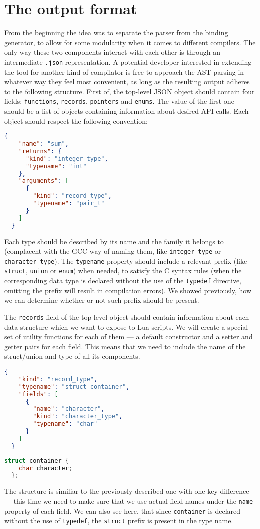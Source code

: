\documentclass[polish, english]{iithesis}
\begin{document}
  \section{The output format}
From the beginning the idea was to separate the parser from the binding generator, to allow for some modularity when it comes to different compilers.
The only way these two components interact with each other is through an intermediate \texttt{.json} representation.
A potential developer interested in extending the tool for another kind of compilator is free to approach the AST parsing in whatever way they feel most convenient, as long as the resulting output adheres to the following structure.
First of, the top-level JSON object should contain four fields: \texttt{functions}, \texttt{records}, \texttt{pointers} and \texttt{enums}. 
The value of the first one should be a list of objects containing information about desired API calls.
Each object should respect the following convention:
\begin{lstlisting}[language=json, caption=Example function \texttt{int sum(pair\_t p)} description]
  {
    "name": "sum",
    "returns": {
      "kind": "integer_type",
      "typename": "int"
    },
    "arguments": [
      {
        "kind": "record_type",
        "typename": "pair_t"
      }
    ]
  }
\end{lstlisting}
Each type should be described by its name and the family it belongs to (complacent with the GCC way of naming them, like \texttt{integer\_type} or \texttt{character\_type}).
The \texttt{typename} property should include a relevant prefix (like \texttt{struct}, \texttt{union} or \texttt{enum}) when needed, to satisfy the C syntax rules (when the corresponding data type is declared without the use of the \texttt{typedef} directive, omitting the prefix will result in compilation errors).
We showed previously, how we can determine whether or not such prefix should be present.

The \texttt{records} field of the top-level object should contain information about each data structure which we want to expose to Lua scripts.
We will create a special set of utility functions for each of them --- a default constructor and a setter and getter pairs for each field.
This means that we need to include the name of the struct/union and type of all its components.
\begin{lstlisting}[language=json, caption=Example \texttt{records} array entry]
  {
    "kind": "record_type",
    "typename": "struct container",
    "fields": [
      {
        "name": "character",
        "kind": "character_type",
        "typename": "char"
      }
    ]
  }
\end{lstlisting}
\begin{lstlisting}[language=c, caption=Corresponding \texttt{struct container} definition]
  struct container {
    char character;
  };
\end{lstlisting}
The structure is similiar to the previously described one with one key difference --- this time we need to make sure that we use actual field names under the \texttt{name} property of each field.
We can also see here, that since \texttt{container} is declared without the use of \texttt{typedef}, the \texttt{struct} prefix is present in the type name.
\end{document}
